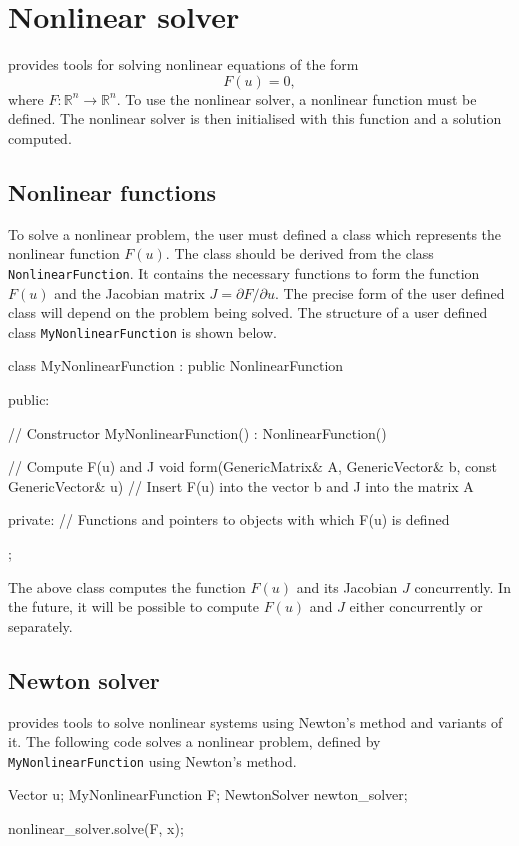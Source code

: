 \chapter{Nonlinear solver}

\dolfin{} provides tools for solving nonlinear equations of the form
\begin{equation}
  F(u) = 0, 
\end{equation}
where $F: \mathbb{R}^{n} \rightarrow \mathbb{R}^{n}$. 
To use the nonlinear solver, a nonlinear function must be defined. 
The nonlinear solver is then initialised with this function and a 
solution computed.

\section{Nonlinear functions}

To solve a nonlinear problem, the user must defined a class which 
represents the nonlinear function $F(u)$. The class 
should be derived from the \dolfin{}  class \texttt{NonlinearFunction}. It
contains the necessary functions to form the function $F(u)$ and the 
Jacobian matrix  $J = \partial F / \partial u$. The precise form of the user 
defined class will depend on the problem being solved.
The structure of a user defined class \texttt{MyNonlinearFunction} is shown below.
%
\begin{code}
class MyNonlinearFunction : public NonlinearFunction
{
public: 
  
 // Constructor 
 MyNonlinearFunction() : NonlinearFunction() {}
  
 // Compute F(u) and J 
 void form(GenericMatrix& A, GenericVector& b, 
           const GenericVector& u)
 {
   // Insert F(u) into the vector b and J into the matrix A 
 }

private:
 // Functions and pointers to objects with which F(u) is defined
};
\end{code}
%
The above class computes the function $F(u)$ and its Jacobian $J$
concurrently. In the future, it will be possible to compute 
$F(u)$ and $J$ either concurrently or separately.

\section{Newton solver}
%
\dolfin{} provides tools to solve nonlinear systems using Newton's method
and variants of it. The following code solves a nonlinear problem, defined by 
\texttt{MyNonlinearFunction} using Newton's method.
%
\begin{code}
Vector u;
MyNonlinearFunction F;
NewtonSolver newton_solver;

nonlinear_solver.solve(F, x);
\end{code}
%


